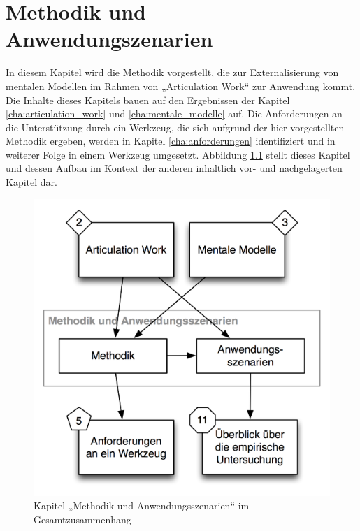 
\chapter{Methodik und Anwendungszenarien} %
\label{cha:methodik}

In diesem Kapitel wird die Methodik vorgestellt, die zur Externalisierung von mentalen Modellen im Rahmen von „Articulation Work“ zur Anwendung kommt. Die Inhalte dieses Kapitels bauen auf den Ergebnissen der Kapitel \ref{cha:articulation_work}  und \ref{cha:mentale_modelle} auf. Die Anforderungen an die Unterstützung durch ein Werkzeug, die sich aufgrund der hier vorgestellten Methodik ergeben, werden in Kapitel \ref{cha:anforderungen} identifiziert und in weiterer Folge in einem Werkzeug umgesetzt. Abbildung \ref{fig:img_Kontextgrafiken_k4} stellt dieses Kapitel und dessen Aufbau im Kontext der anderen inhaltlich vor- und nachgelagerten Kapitel dar.


\begin{figure}[htbp]
	\centering
		\includegraphics[scale=0.6]{img/Kontextgrafiken/k4.png}
	\caption{Kapitel „Methodik und Anwendungsszenarien“ im Gesamtzusammenhang}
	\label{fig:img_Kontextgrafiken_k4}
\end{figure}


